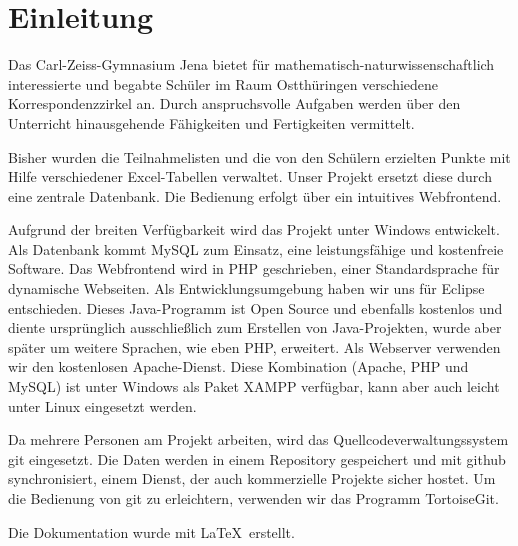 \chapter{Einleitung}
Das Carl-Zeiss-Gymnasium Jena bietet für mathematisch-naturwissenschaftlich interessierte und begabte Schüler im Raum Ostthüringen verschiedene Korrespondenzzirkel an. Durch anspruchsvolle Aufgaben werden über den Unterricht hinausgehende Fähigkeiten und Fertigkeiten vermittelt. \cite{Korrespondenzzirkel}

Bisher wurden die Teilnahmelisten und die von den Schülern erzielten Punkte mit Hilfe verschiedener Excel-Tabellen verwaltet. Unser Projekt ersetzt diese durch eine zentrale Datenbank. Die Bedienung erfolgt über ein intuitives Webfrontend. 

Aufgrund der breiten Verfügbarkeit wird das Projekt unter Windows entwickelt. Als Datenbank kommt MySQL zum Einsatz, eine leistungsfähige und kostenfreie Software. Das Webfrontend wird in PHP geschrieben, einer Standardsprache für dynamische Webseiten. Als Entwicklungsumgebung haben wir uns für Eclipse entschieden. Dieses Java-Programm ist Open Source und ebenfalls kostenlos und diente ursprünglich ausschließlich zum Erstellen von Java-Projekten, wurde aber später um weitere Sprachen, wie eben PHP, erweitert. Als Webserver verwenden wir den kostenlosen Apache-Dienst. Diese Kombination (Apache, PHP und MySQL) ist unter Windows als Paket XAMPP verfügbar, kann aber auch leicht unter Linux eingesetzt werden. \cite{Apache} \cite{Eclipse} \cite{MySql} 

Da mehrere Personen am Projekt arbeiten, wird das Quellcodeverwaltungssystem git eingesetzt. Die Daten werden in einem Repository gespeichert und mit github synchronisiert, einem Dienst, der auch kommerzielle Projekte sicher hostet. Um die Bedienung von git zu erleichtern, verwenden wir das Programm TortoiseGit. \cite{git} \cite{Tortoisegit} \cite{github}

Die Dokumentation wurde mit \LaTeX \ erstellt.
